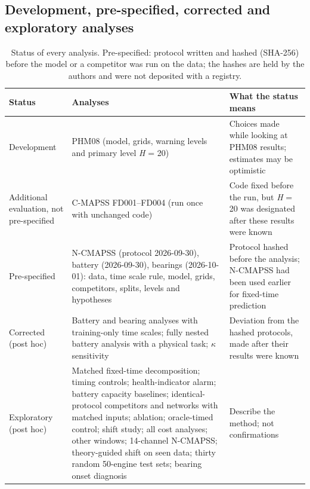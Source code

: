 \documentclass[a4paper,fleqn,doubleblind]{cas-dc}
\begin{document}
\subsection{Development, pre-specified, corrected and exploratory analyses}

\begin{table}[!tbp]
\footnotesize\setlength{\tabcolsep}{4pt}
\caption{Status of every analysis. Pre-specified: protocol written and hashed (SHA-256) before the model or a competitor was run on the data; the hashes are held by the authors and were not deposited with a registry.}
\begin{tabular}{@{}>{\raggedright\arraybackslash}p{}>{\raggedright\arraybackslash}p{}>{\raggedright\arraybackslash}p{}@{}}
\toprule
Status & Analyses & What the status means \\
\midrule
Development & PHM08 (model, grids, warning levels and primary level \textit{H} = 20) & Choices made while looking at PHM08 results; estimates may be optimistic \\
Additional evaluation, not pre-specified & C-MAPSS FD001--FD004 (run once with unchanged code) & Code fixed before the run, but \textit{H} = 20 was designated after these results were known \\
Pre-specified & N-CMAPSS (protocol 2026-09-30), battery (2026-09-30), bearings (2026-10-01): data, time scale rule, model, grids, competitors, splits, levels and hypotheses & Protocol hashed before the analysis; N-CMAPSS had been used earlier for fixed-time prediction \\
Corrected (post hoc) & Battery and bearing analyses with training-only time scales; fully nested battery analysis with a physical task; $\kappa$ sensitivity & Deviation from the hashed protocols, made after their results were known \\
Exploratory (post hoc) & Matched fixed-time decomposition; timing controls; health-indicator alarm; battery capacity baselines; identical-protocol competitors and networks with matched inputs; ablation; oracle-timed control; shift study; all cost analyses; other windows; 14-channel N-CMAPSS; theory-guided shift on seen data; thirty random 50-engine test sets; bearing onset diagnosis & Describe the method; not confirmations \\
\bottomrule
\end{tabular}
\end{table}
\end{document}
